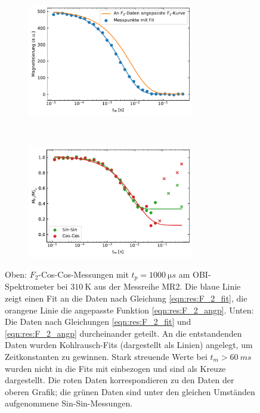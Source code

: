 \begin{figure}
	\centering
	\begin{subfigure}{\textwidth}
		\centering
		\includegraphics[width=0.8\textwidth]{graphics/plot/f2_310.pdf}
	\end{subfigure} \\
	\begin{subfigure}{\textwidth}
		\centering
		\includegraphics[width=0.8\textwidth]{graphics/plot/f2_fit3.pdf}
	\end{subfigure}
	\caption{Oben: $F_2$-Cos-Cos-Messungen mit $t_p = \SI{1000}{\micro s}$ am OBI-Spektrometer bei $\SI{310}{\kelvin}$ aus der Messreihe MR2. Die blaue Linie zeigt einen Fit an die Daten nach Gleichung \eqref{eqn:res:F_2_fit}, die orangene Linie die angepasste Funktion \eqref{eqn:res:F_2_angp}. Unten: Die Daten nach Gleichungen \eqref{eqn:res:F_2_fit} und \eqref{eqn:res:F_2_angp} durcheinander geteilt. An die entstandenden Daten wurden Kohlrausch-Fits (dargestellt als Linien) angelegt, um Zeitkonstanten zu gewinnen. Stark streuende Werte bei $t_m > \SI{60}{ms}$ wurden nicht in die Fits mit einbezogen und sind als Kreuze dargestellt. Die roten Daten korrespondieren zu den Daten der oberen Grafik; die grünen Daten sind unter den gleichen Umständen aufgenommene Sin-Sin-Messungen.}
	\label{fig:res:F_2_fit}
	\label{fig:res:F_2_T_1}
\end{figure}

